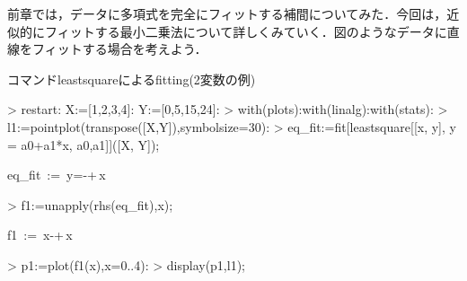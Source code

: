 前章では，データに多項式を完全にフィットする補間についてみた．今回は，近似的にフィットする最小二乗法について詳しくみていく．図のようなデータに直線をフィットする場合を考えよう．


コマンドleastsquareによるfitting(2変数の例)
\begin{MapleInput}
> restart: X:=[1,2,3,4]: Y:=[0,5,15,24]:
> with(plots):with(linalg):with(stats):
> l1:=pointplot(transpose([X,Y]),symbolsize=30):
> eq_fit:=fit[leastsquare[[x, y], y = a0+a1*x, {a0,a1}]]([X, Y]);
\end{MapleInput}
\begin{MapleOutput}
eq\_fit\, := \,y=-+{}\,x
\end{MapleOutput}
\begin{MapleInput}
> f1:=unapply(rhs(eq_fit),x);
\end{MapleInput}
\begin{MapleOutput}
f1\, := \,x\mapsto -+{}\,x
\end{MapleOutput}
\begin{MapleInput}
> p1:=plot(f1(x),x=0..4):
> display(p1,l1);
\end{MapleInput}
